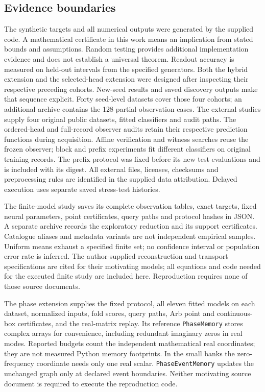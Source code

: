 \documentclass[11pt,a4paper]{article}
\theoremstyle{definition}\newtheorem{definition}[theorem]{Definition}
\begin{document}
\subsection{Evidence boundaries}
The synthetic targets and all numerical outputs were generated by the supplied code. A mathematical certificate in this work means an implication from stated bounds and assumptions. Random testing provides additional implementation evidence and does not establish a universal theorem. Readout accuracy is measured on held-out intervals from the specified generators. Both the hybrid extension and the selected-head extension were designed after inspecting their respective preceding cohorts. New-seed results and saved discovery outputs make that sequence explicit. Forty seed-level datasets cover those four cohorts; an additional archive contains the 128 partial-observation cases. The external studies supply four original public datasets, fitted classifiers and audit paths. The ordered-head and full-record observer audits retain their respective prediction functions during acquisition. Affine verification and witness searches reuse the frozen observer; block and prefix experiments fit different classifiers on original training records. The prefix protocol was fixed before its new test evaluations and is included with its digest. All external files, licenses, checksums and preprocessing rules are identified in the supplied data attribution. Delayed execution uses separate saved stress-test histories.

The finite-model study saves its complete observation tables, exact targets, fixed neural parameters, point certificates, query paths and protocol hashes in JSON. A separate archive records the exploratory reduction and its support certificates. Catalogue aliases and metadata variants are not independent empirical samples. Uniform means exhaust a specified finite set; no confidence interval or population error rate is inferred. The author-supplied reconstruction and transport specifications are cited for their motivating models; all equations and code needed for the executed finite study are included here. Reproduction requires none of those source documents.

The phase extension supplies the fixed protocol, all eleven fitted models on each dataset, normalized inputs, fold scores, query paths, Arb point and continuous-box certificates, and the real-matrix replay. Its reference \texttt{PhaseMemory} stores complex arrays for convenience, including redundant imaginary zeros in real modes. Reported budgets count the independent mathematical real coordinates; they are not measured Python memory footprints. In the small banks the zero-frequency coordinate needs only one real scalar. \texttt{PhaseEventMemory} updates the unchanged graph only at declared event boundaries. Neither motivating source document is required to execute the reproduction code.
\end{document}
